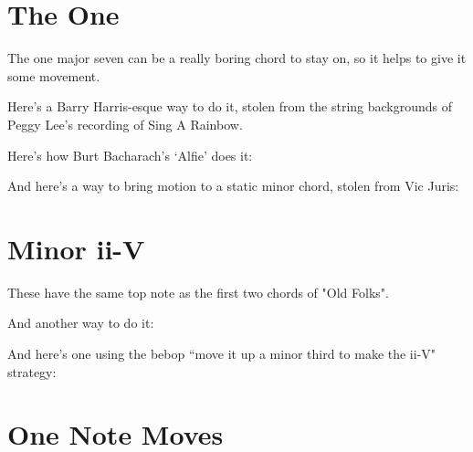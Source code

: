 
\def\numfrets{6}

\section{The One}

The one major seven can be a really boring chord to stay on, so it helps to give it some movement.

Here's a Barry Harris-esque way to do it, stolen from the string backgrounds of Peggy Lee's recording of Sing A Rainbow.


Here's how Burt Bacharach's `Alfie' does it:


And here's a way to bring motion to a static minor chord, stolen from Vic Juris:

\def\numfrets{7}
\def\numfrets{6}

\section{Minor ii-V}

These have the same top note as the first two chords of "Old Folks".


And another way to do it:


And here's one using the bebop ``move it up a minor third to make the ii-V" strategy:


\section{One Note Moves}

